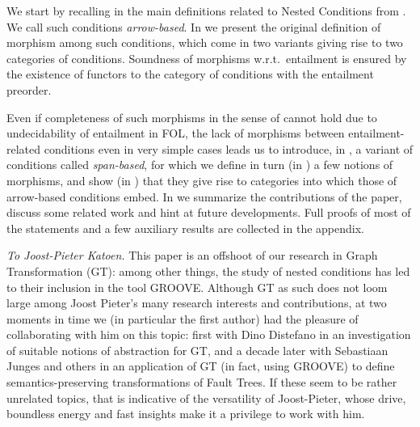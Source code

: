 We start by recalling in  the main definitions related to Nested Conditions from \cite{Rensink-FOL}. We call such conditions \emph{arrow-based}.
In  we present the original definition of morphism among such conditions, which come in two variants giving rise to two categories of conditions. Soundness of morphisms w.r.t.~entailment is ensured by the existence of functors to the category of conditions with the entailment preorder.

Even if completeness of such morphisms in the sense of \cite{DBLP:conf/stoc/ChandraM77} cannot hold due to undecidability of entailment in FOL, the lack of morphisms between entailment-related conditions even in very simple cases leads us to introduce, in , a variant of conditions called \emph{span-based}, for which we define in turn (in ) a few notions of morphisms, and show (in ) that they give rise to categories into which those of arrow-based conditions embed.
In  we summarize the contributions of the paper, discuss some related work and hint at future developments.
\iffest
Full proofs of most of the statements and a few auxiliary results are collected in the appendix.

\medskip\noindent 
\emph{To Joost-Pieter Katoen.} This paper is an offshoot of our research in Graph Transformation (GT): among other things, the study of nested conditions has led to their inclusion in the tool GROOVE. Although GT as such does not loom large among Joost Pieter's many research interests and contributions, at two moments in time we (in particular the first author) had the pleasure of collaborating with him on this topic: first with Dino Distefano in an investigation of suitable notions of abstraction for GT, and a decade later with Sebastiaan Junges and others in an application of GT (in fact, using GROOVE) to define semantics-preserving transformations of Fault Trees. If these seem to be rather unrelated topics, that is indicative of the versatility of Joost-Pieter, whose drive, boundless energy and fast insights make it a privilege to work with him.
\fi
 